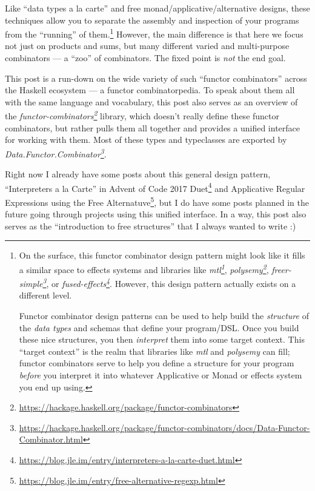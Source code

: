 \documentclass[]{article}
\renewcommand{\href}[2]{#2\footnote{\url{#1}}}
\begin{document}
Like ``data types a la carte'' and free monad/applicative/alternative designs,
these techniques allow you to separate the assembly and inspection of your
programs from the ``running'' of them.\footnote{On the surface, this functor
  combinator design pattern might look like it fills a similar space to effects
  systems and libraries like
  \emph{\href{https://hackage.haskell.org/package/mtl}{mtl}},
  \emph{\href{https://hackage.haskell.org/package/polysemy}{polysemy}},
  \emph{\href{https://hackage.haskell.org/package/freer-simple}{freer-simple}},
  or
  \emph{\href{https://hackage.haskell.org/package/fused-effects}{fused-effects}}.
  However, this design pattern actually exists on a different level.

  Functor combinator design patterns can be used to help build the
  \emph{structure} of the \emph{data types} and schemas that define your
  program/DSL. Once you build these nice structures, you then \emph{interpret}
  them into some target context. This ``target context'' is the realm that
  libraries like \emph{mtl} and \emph{polysemy} can fill; functor combinators
  serve to help you define a structure for your program \emph{before} you
  interpret it into whatever Applicative or Monad or effects system you end up
  using.} However, the main difference is that here we focus not just on
products and sums, but many different varied and multi-purpose combinators --- a
``zoo'' of combinators. The fixed point is \emph{not} the end goal.

This post is a run-down on the wide variety of such ``functor combinators''
across the Haskell ecosystem --- a functor combinatorpedia. To speak about them
all with the same language and vocabulary, this post also serves as an overview
of the
\emph{\href{https://hackage.haskell.org/package/functor-combinators}{functor-combinators}}
library, which doesn't really define these functor combinators, but rather pulls
them all together and provides a unified interface for working with them. Most
of these types and typeclasses are exported by
\emph{\href{https://hackage.haskell.org/package/functor-combinators/docs/Data-Functor-Combinator.html}{Data.Functor.Combinator}}.

Right now I already have some posts about this general design pattern,
\href{https://blog.jle.im/entry/interpreters-a-la-carte-duet.html}{``Interpreters
a la Carte'' in Advent of Code 2017 Duet} and
\href{https://blog.jle.im/entry/free-alternative-regexp.html}{Applicative
Regular Expressions using the Free Alternatuve}, but I do have some posts
planned in the future going through projects using this unified interface. In a
way, this post also serves as the ``introduction to free structures'' that I
always wanted to write :)
\end{document}
